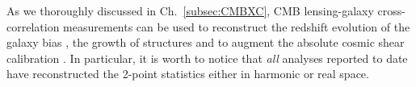

As we thoroughly discussed in Ch.~\eqref{subsec:CMBXC}, CMB lensing-galaxy cross-correlation measurements can be used to reconstruct the redshift evolution of 
the galaxy bias \citep{Bianchini2015,Allison2015a,Bianchini2016a}, the growth of structures 
\citep{Giannantonio2016a} and to augment the absolute cosmic shear calibration \citep{Baxter2016}. In particular, it is worth to notice that \emph{all} 
analyses reported to date have reconstructed the 2-point statistics either in harmonic  or real space.


